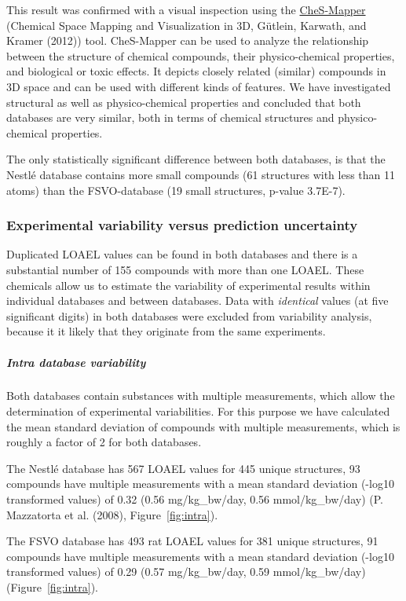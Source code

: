 \documentclass[]{achemso}
\let\oldsubparagraph\subparagraph
\renewcommand{\subparagraph}[1]{\oldsubparagraph{#1}\mbox{}}
\begin{document}
This result was confirmed with a visual inspection using the
\href{http://ches-mapper.org}{CheS-Mapper} (Chemical Space Mapping and
Visualization in 3D, Gütlein, Karwath, and Kramer (2012)) tool.
CheS-Mapper can be used to analyze the relationship between the
structure of chemical compounds, their physico-chemical properties, and
biological or toxic effects. It depicts closely related (similar)
compounds in 3D space and can be used with different kinds of features.
We have investigated structural as well as physico-chemical properties
and concluded that both databases are very similar, both in terms of
chemical structures and physico-chemical properties.

The only statistically significant difference between both databases, is
that the Nestlé database contains more small compounds (61 structures
with less than 11 atoms) than the FSVO-database (19 small structures,
p-value 3.7E-7).

\subsubsection{Experimental variability versus prediction
uncertainty}\label{experimental-variability-versus-prediction-uncertainty}

Duplicated LOAEL values can be found in both databases and there is a
substantial number of 155 compounds with more than one LOAEL. These
chemicals allow us to estimate the variability of experimental results
within individual databases and between databases. Data with
\emph{identical} values (at five significant digits) in both databases
were excluded from variability analysis, because it it likely that they
originate from the same experiments.

\subparagraph{Intra database
variability}\label{intra-database-variability}

Both databases contain substances with multiple measurements, which
allow the determination of experimental variabilities. For this purpose
we have calculated the mean standard deviation of compounds with
multiple measurements, which is roughly a factor of 2 for both
databases.

The Nestlé database has 567 LOAEL values for 445 unique structures, 93
compounds have multiple measurements with a mean standard deviation
(-log10 transformed values) of 0.32 (0.56 mg/kg\_bw/day, 0.56
mmol/kg\_bw/day) (P. Mazzatorta et al. (2008), Figure~\ref{fig:intra}).

The FSVO database has 493 rat LOAEL values for 381 unique structures, 91
compounds have multiple measurements with a mean standard deviation
(-log10 transformed values) of 0.29 (0.57 mg/kg\_bw/day, 0.59
mmol/kg\_bw/day) (Figure~\ref{fig:intra}).
\end{document}
